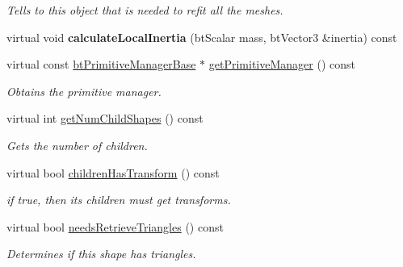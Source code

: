 \begin{DoxyCompactItemize}
\begin{DoxyCompactList}\small\item\em Tells to this object that is needed to refit all the meshes. \end{DoxyCompactList}\item 
\mbox{\label{classbtGImpactMeshShape_a49c6bed561a6a241dbc833192a093174}} 
virtual void {\bfseries calculate\+Local\+Inertia} (bt\+Scalar mass, bt\+Vector3 \&inertia) const
\item 
\mbox{\label{classbtGImpactMeshShape_a354238c358d9c87d969888a90059e496}} 
virtual const \hyperlink{classbtPrimitiveManagerBase}{bt\+Primitive\+Manager\+Base} $\ast$ \hyperlink{classbtGImpactMeshShape_a354238c358d9c87d969888a90059e496}{get\+Primitive\+Manager} () const
\begin{DoxyCompactList}\small\item\em Obtains the primitive manager. \end{DoxyCompactList}\item 
\mbox{\label{classbtGImpactMeshShape_a1f5e974d1fa7af3ac25c6d98e106bf55}} 
virtual int \hyperlink{classbtGImpactMeshShape_a1f5e974d1fa7af3ac25c6d98e106bf55}{get\+Num\+Child\+Shapes} () const
\begin{DoxyCompactList}\small\item\em Gets the number of children. \end{DoxyCompactList}\item 
\mbox{\label{classbtGImpactMeshShape_a0982a5913488f1446c06446c1d8ec645}} 
virtual bool \hyperlink{classbtGImpactMeshShape_a0982a5913488f1446c06446c1d8ec645}{children\+Has\+Transform} () const
\begin{DoxyCompactList}\small\item\em if true, then its children must get transforms. \end{DoxyCompactList}\item 
\mbox{\label{classbtGImpactMeshShape_afa72eb4e1537ca2853ae731eb87f32d0}} 
virtual bool \hyperlink{classbtGImpactMeshShape_afa72eb4e1537ca2853ae731eb87f32d0}{needs\+Retrieve\+Triangles} () const
\begin{DoxyCompactList}\small\item\em Determines if this shape has triangles. \end{DoxyCompactList}\item 

\end{DoxyCompactItemize}
